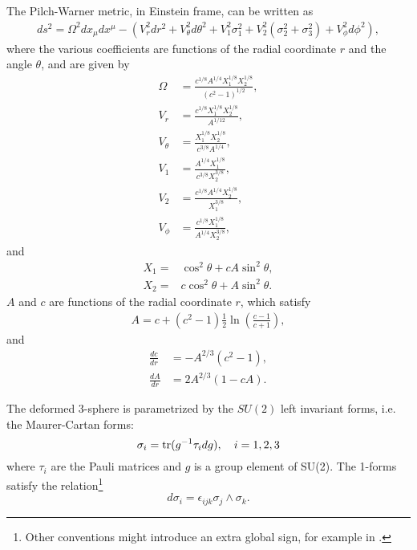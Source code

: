 The Pilch-Warner metric, in Einstein frame, can be written as \cite{Pilch:2003jg}
\begin{align}\label{eq:PWmetric}
ds^2 =
\Omega^2 dx_\mu dx^\mu -\left(
V_r^2 dr^2 + V_\theta^2 d\theta^2 + V_1^2 \sigma_1^2 + V_2^2 (\sigma_2^2 + \sigma_3^2) + V_\phi^2 d\phi^2\right),
\end{align}
where the various coefficients are functions of the radial coordinate $r$ and the angle $\theta$, and are given by
\begin{align}\label{eq:PWvielbeins}
\Omega &= \frac{c^{1/8} A^{1/4} X_1^{1/8} X_2^{1/8}}{(c^2 - 1)^{1/2}},\nonumber\\
V_r &= \frac{c^{1/8}X_1^{1/8} X_2^{1/8}}{A^{1/12}},\nonumber\\
V_\theta &= \frac{X_1^{1/8} X_2^{1/8}}{c^{3/8}A^{1/4}},\nonumber\\
V_1 &= \frac{A^{1/4}X_1^{1/8} }{c^{3/8}X_2^{3/8}},\nonumber\\
V_2 &= \frac{c^{1/8}A^{1/4}X_2^{1/8} }{X_1^{3/8}}, \nonumber\\
V_\phi &= \frac{c^{1/8}X_1^{1/8} }{A^{1/4}X_2^{3/8}},
\end{align}
and
\begin{align}
X_1 = & \cos^2\theta + cA  \sin^2\theta,\nonumber\\
X_2 = & c \cos^2\theta + A  \sin^2\theta.
\end{align}
$A$ and $c$ are functions of the radial coordinate $r$, which satisfy
\begin{align}
A = c+(c^2 -1)\frac{1}{2}\ln\left(\frac{c-1}{c+1}\right),
\end{align}
and
\begin{align}
\label{dcdr} \frac{dc}{dr} &= - A^{2/3}(c^2 - 1),\\ 
\label{dAdr} \frac{dA}{dr} &= 2 A^{2/3}\left(1 - c A\right).
\end{align}

The deformed 3-sphere is parametrized by the $SU(2)$ left invariant forms, i.e. the Maurer-Cartan forms:
\begin{equation}
\sigma_i = \mathop{\mathrm{tr}}(g^{-1}\tau_i d g), \quad i = 1,2,3
\end{equation}
where $\tau_i$ are the Pauli matrices and $g$ is a group element of SU(2). The 1-forms satisfy the relation\footnote{Other conventions might introduce an extra global sign, for example in \cite{Buchel:2000cn}.}
\begin{equation}
 d\sigma_i  = \epsilon_{i j k} \sigma_j \wedge \sigma_k.
\end{equation}



